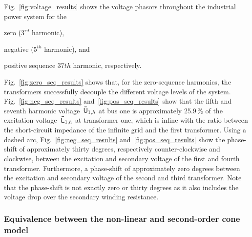 Fig.~\ref{fig:voltage_results} shows the voltage phasors throughout the industrial power system for the
\begin{enumerate*}
    \item [(a)] zero ($3^{rd}$ harmonic),
    \item [(b)] negative ($5^{th}$ harmonic), and
    \item [(c)] positive sequence $37{th}$ harmonic, respectively.
\end{enumerate*}
Fig.~\ref{fig:zero_seq_results} shows that, for the zero-sequence harmonics, the transformers successfully decouple the different voltage levels of the system. Fig.~\ref{fig:neg_seq_results} and~\ref{fig:pos_seq_results} show that the fifth and seventh harmonic voltage~$\mathsf{\bar{U}}_{1,h}$ at bus one is approximately 25.9\,\% of the excitation voltage~$\mathsf{\bar{E}}_{1,h}$ at transformer one, which is inline with the ratio between the short-circuit impedance of the infinite grid and the first transformer. Using a dashed arc, Fig.~\ref{fig:neg_seq_results} and~\ref{fig:pos_seq_results} show the phase-shift of approximately thirty degrees, respectively counter-clockwise and clockwise, between the excitation and secondary voltage of the first and fourth transformer. Furthermore, a phase-shift of approximately zero degrees between the excitation and secondary voltage of the second and third transformer. Note that the phase-shift is not exactly zero or thirty degrees as it also includes the voltage drop over the secondary winding resistance.

\subsubsection{Equivalence between the non-linear and second-order cone model} 

